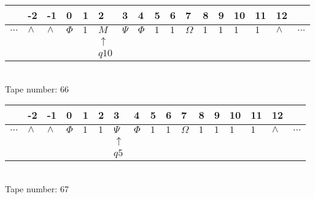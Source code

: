 \documentclass{article}
\begin{document}
\begin{table}[H]
\centering
\begin{tabular}{lllllllllllllllll}
 & -2 & -1 & 0 & 1 & 2 & 3 & 4 & 5 & 6 & 7 & 8 & 9 & 10 & 11 & 12 & \\
\hline
$...$ & \multicolumn{1}{|l|}{$\wedge$} & \multicolumn{1}{|l|}{$\wedge$} & \multicolumn{1}{|l|}{$\Phi$} & \multicolumn{1}{|l|}{$1$} & \multicolumn{1}{|l|}{$M$} & \multicolumn{1}{|l|}{$\Psi$} & \multicolumn{1}{|l|}{$\Phi$} & \multicolumn{1}{|l|}{$1$} & \multicolumn{1}{|l|}{$1$} & \multicolumn{1}{|l|}{$\Omega$} & \multicolumn{1}{|l|}{$1$} & \multicolumn{1}{|l|}{$1$} & \multicolumn{1}{|l|}{$1$} & \multicolumn{1}{|l|}{$1$} & \multicolumn{1}{|l|}{$\wedge$} & $...$\\
\hline
&  &  &  &  & $\uparrow$ &  &  &  &  &  &  &  &  &  &  &  \\
&  &  &  &  & $ q10 $ &  &  &  &  &  &  &  &  &  &  &  \\
\end{tabular}
\\
Tape number: 66
\noindent\makebox[\linewidth]{\hdashrule{\textwidth}{1pt}{1pt}}\end{table}

\begin{table}[H]
\centering
\begin{tabular}{lllllllllllllllll}
 & -2 & -1 & 0 & 1 & 2 & 3 & 4 & 5 & 6 & 7 & 8 & 9 & 10 & 11 & 12 & \\
\hline
$...$ & \multicolumn{1}{|l|}{$\wedge$} & \multicolumn{1}{|l|}{$\wedge$} & \multicolumn{1}{|l|}{$\Phi$} & \multicolumn{1}{|l|}{$1$} & \multicolumn{1}{|l|}{$1$} & \multicolumn{1}{|l|}{$\Psi$} & \multicolumn{1}{|l|}{$\Phi$} & \multicolumn{1}{|l|}{$1$} & \multicolumn{1}{|l|}{$1$} & \multicolumn{1}{|l|}{$\Omega$} & \multicolumn{1}{|l|}{$1$} & \multicolumn{1}{|l|}{$1$} & \multicolumn{1}{|l|}{$1$} & \multicolumn{1}{|l|}{$1$} & \multicolumn{1}{|l|}{$\wedge$} & $...$\\
\hline
&  &  &  &  &  & $\uparrow$ &  &  &  &  &  &  &  &  &  &  \\
&  &  &  &  &  & $ q5 $ &  &  &  &  &  &  &  &  &  &  \\
\end{tabular}
\\
Tape number: 67
\noindent\makebox[\linewidth]{\hdashrule{\textwidth}{1pt}{1pt}}\end{table}
\end{document}
